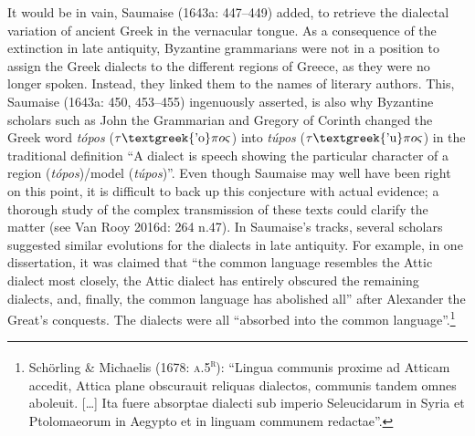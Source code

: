 \documentclass[12pt]{article}
\newenvironment{styleStandard}{\renewcommand\baselinestretch{1.25}\setlength\leftskip{0in}\setlength\rightskip{0in}\setlength\parindent{0.1972in}\setlength\parfillskip{0pt plus 1fil}\setlength\parskip{0in plus 1pt}\writerlistparindent\writerlistleftskip\leavevmode\normalfont\normalsize\writerlistlabel\ignorespaces}{\unskip\vspace{0in plus 1pt}\par}
\newcommand\writerlistleftskip{}
\newcommand\writerlistparindent{}
\newcommand\writerlistlabel{}
\begin{document}
\begin{styleStandard}
It would be in vain, Saumaise (1643a: 447–449) added, to retrieve the dialectal variation of ancient Greek in the vernacular tongue. As a consequence of the extinction in late antiquity, Byzantine grammarians were not in a position to assign the Greek dialects to the different regions of Greece, as they were no longer spoken. Instead, they linked them to the names of literary authors. This, Saumaise (1643a: 450, 453–455) ingenuously asserted, is also why Byzantine scholars such as John the Grammarian and Gregory of Corinth changed the Greek word \textit{tópos }($\tau \text{\textgreek{'o}}\pi o\varsigma $) into \textit{túpos} ($\tau \text{\textgreek{'u}}\pi o\varsigma $) in the traditional definition “A dialect is speech showing the particular character of a region (\textit{tópos})/model (\textit{túpos})”. Even though Saumaise may well have been right on this point, it is difficult to back up this conjecture with actual evidence; a thorough study of the complex transmission of these texts could clarify the matter (see Van Rooy 2016d: 264 n.47). In Saumaise’s tracks, several scholars suggested similar evolutions for the dialects in late antiquity. For example, in one dissertation, it was claimed that “the common language resembles the Attic dialect most closely, the Attic dialect has entirely obscured the remaining dialects, and, finally, the common language has abolished all” after Alexander the Great’s conquests. The dialects were all “absorbed into the common language”.\footnote{ Schörling \& Michaelis (1678: \textsc{a.5}\textsc{\textsuperscript{r}}): “Lingua communis proxime ad Atticam accedit, Attica plane obscurauit reliquas dialectos, communis tandem omnes aboleuit. […] Ita fuere absorptae dialecti sub imperio Seleucidarum in Syria et Ptolomaeorum in Aegypto et in linguam communem redactae”.}
\end{styleStandard}
\end{document}
